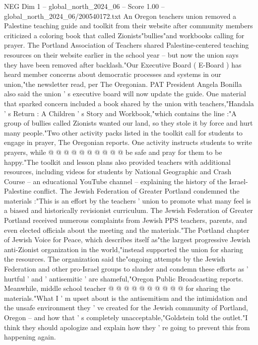 \begin{textsample}{NEG Dim 1 – global\_north\_2024\_06 – Score 1.00 – global\_north\_2024\_06/200540172.txt}  \label{ex:f1_neg_209}
An Oregon teachers union removed a Palestine teaching guide and toolkit from their website after community members criticized a coloring book that called Zionists"bullies"and workbooks calling for prayer.
The Portland Association of Teachers shared Palestine-centered teaching resources on their website earlier in the school year -- but now the union says they have been removed after backlash."Our Executive Board ( E-Board ) has heard member concerns about democratic processes and systems in our union,"the newsletter read, per The Oregonian.
PAT President Angela Bonilla also said the union ' s executive board will now update the guide.
One material that sparked concern included a book shared by the union with teachers,"Handala ' s Return : A Children ' s Story and Workbook,"which contains the line :"A group of bullies called Zionists wanted our land, so they stole it by force and hurt many people."Two other activity packs listed in the toolkit call for students to engage in prayer, The Oregonian reports.
One activity instructs students to write prayers, while @ @ @ @ @ @ @ @ @ @ be safe and pray for them to be happy."The toolkit and lesson plans also provided teachers with additional resources, including videos for students by National Geographic and Crash Course -- an educational YouTube channel -- explaining the history of the Israel-Palestine conflict.
The Jewish Federation of Greater Portland condemned the materials :"This is an effort by the teachers ' union to promote what many feel is a biased and historically revisionist curriculum.
The Jewish Federation of Greater Portland received numerous complaints from Jewish PPS teachers, parents, and even elected officials about the meeting and the materials."The Portland chapter of Jewish Voice for Peace, which describes itself as"the largest progressive Jewish anti-Zionist organization in the world,"instead supported the union for sharing the resources.
The organization said the"ongoing attempts by the Jewish Federation and other pro-Israel groups to slander and condemn these efforts as ' hurtful ' and ' antisemitic ' are shameful,"Oregon Public Broadcasting reports.
Meanwhile, middle school teacher @ @ @ @ @ @ @ @ @ @ for sharing the materials."What I ' m upset about is the antisemitism and the intimidation and the unsafe environment they ' ve created for the Jewish community of Portland, Oregon -- and how that ' s completely unacceptable,"Goldstein told the outlet."I think they should apologize and explain how they ' re going to prevent this from happening again.

\end{textsample}
